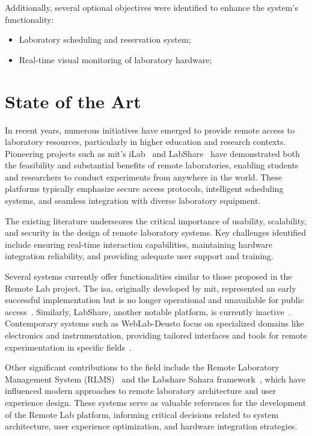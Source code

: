 Additionally, several optional objectives were identified to enhance the system's functionality:
\begin{itemize}
\item Laboratory scheduling and reservation system;
\item Real-time visual monitoring of laboratory hardware;
\end{itemize}

\section{State of the Art}\label{sec:state_of_art}
In recent years, numerous initiatives have emerged to provide remote access to laboratory resources, particularly in higher education and research contexts. Pioneering projects such as \acs{mit}'s iLab~\cite{ilab} and LabShare~\cite{labshare} have demonstrated both the feasibility and substantial benefits of remote laboratories, enabling students and researchers to conduct experiments from anywhere in the world. These platforms typically emphasize secure access protocols, intelligent scheduling systems, and seamless integration with diverse laboratory equipment.

The existing literature underscores the critical importance of usability, scalability, and security in the design of remote laboratory systems. Key challenges identified include ensuring real-time interaction capabilities, maintaining hardware integration reliability, and providing adequate user support and training.

Several systems currently offer functionalities similar to those proposed in the Remote Lab project. The \acs{isa}, originally developed by \acs{mit}, represented an early successful implementation but is no longer operational and unavailable for public access~\cite{ilab}. Similarly, LabShare, another notable platform, is currently inactive~\cite{labshare}. Contemporary systems such as WebLab-Deusto focus on specialized domains like electronics and instrumentation, providing tailored interfaces and tools for remote experimentation in specific fields~\cite{weblabdeusto}.

Other significant contributions to the field include the Remote Laboratory Management System (RLMS)~\cite{rlms} and the Labshare Sahara framework~\cite{sahara}, which have influenced modern approaches to remote laboratory architecture and user experience design. These systems serve as valuable references for the development of the Remote Lab platform, informing critical decisions related to system architecture, user experience optimization, and hardware integration strategies.

